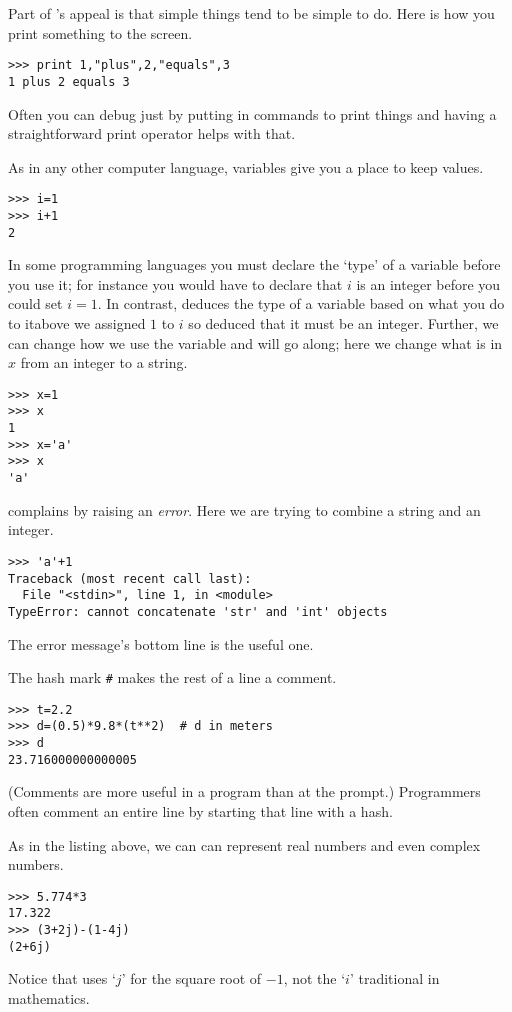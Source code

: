 Part of \python's appeal is that simple things tend to be simple to do.
Here is how you print something to the screen.
\begin{lstlisting}[style=python]
>>> print 1,"plus",2,"equals",3
1 plus 2 equals 3
\end{lstlisting}
Often you can debug just by putting in commands to print things 
and having a straightforward print operator helps with that. 

As in any other computer language, variables give you a place to keep values.
\begin{lstlisting}[style=python]
>>> i=1
>>> i+1
2
\end{lstlisting}
In some programming languages you must declare the `type' of a variable
before you use it; for instance you would have to declare 
that $i$ is an integer before you could set $i=1$.
In contrast, \python{} deduces the type of a variable 
based on what you do to it\Dash above we assigned $1$ to $i$ 
so \python{} deduced that it must be an integer.
Further, we can change how we use the variable and \python{} will 
go along; here we change what is in $x$ from an integer to a string.
\begin{lstlisting}[style=python]
>>> x=1
>>> x
1
>>> x='a'
>>> x
'a'
\end{lstlisting}

\python{} complains by raising an \textit{error}.
Here we are trying to combine a string and an integer. 
\begin{lstlisting}[style=python]
>>> 'a'+1
Traceback (most recent call last):
  File "<stdin>", line 1, in <module>
TypeError: cannot concatenate 'str' and 'int' objects
\end{lstlisting}
The error message's bottom line is the useful one.

The hash mark \lstinline[style=inline]!#! makes the rest of a line a comment.
\begin{lstlisting}[style=python]
>>> t=2.2
>>> d=(0.5)*9.8*(t**2)  # d in meters
>>> d
23.716000000000005
\end{lstlisting}
(Comments are more useful in a program than at the prompt.)
Programmers often comment an entire line by starting 
that line with a hash. 

As in the listing above, we can can represent real 
numbers 
and even complex numbers.
\begin{lstlisting}[style=python]
>>> 5.774*3
17.322
>>> (3+2j)-(1-4j)
(2+6j)
\end{lstlisting}
Notice that \python{} uses `$j$' for the square
root of $-1$, not the `$i$' traditional in mathematics.

